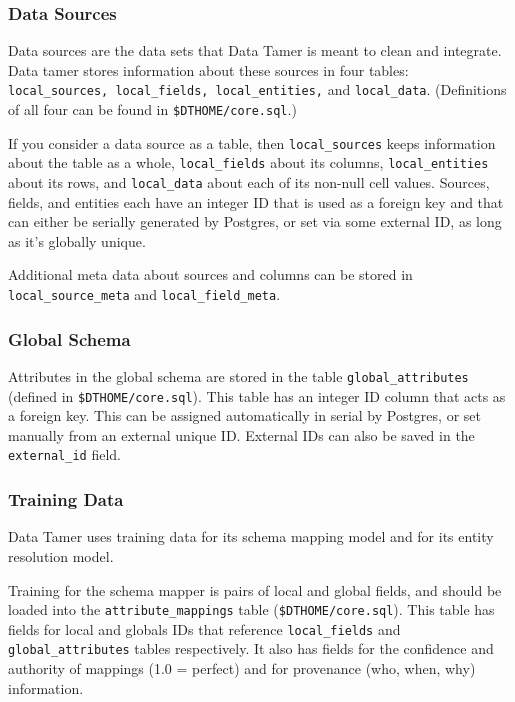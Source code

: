 \documentclass[12pt]{article}
\begin{document}
\subsubsection{Data Sources}

Data sources are the data sets that Data Tamer is meant to clean and integrate.  Data tamer stores information about these sources in four tables: \texttt{local\_sources, local\_fields, local\_entities,} and \texttt{local\_data}.  (Definitions of all four can be found in \texttt{\$DTHOME/core.sql}.)

If you consider a data source as a table, then \texttt{local\_sources} keeps information about the table as a whole, \texttt{local\_fields} about its columns, \texttt{local\_entities} about its rows, and \texttt{local\_data} about each of its non-null cell values.  Sources, fields, and entities each have an integer ID that is used as a foreign key and  that can either be serially generated by Postgres, or set via some external ID, as long as it's globally unique.

Additional meta data about sources and columns can be stored in \texttt{local\_source\_meta} and \texttt{local\_field\_meta}.

\subsubsection{Global Schema}

Attributes in the global schema are stored in the table \texttt{global\_attributes} (defined in \texttt{\$DTHOME/core.sql}).  This table has an integer ID column that acts as a foreign key.  This can be assigned automatically in serial by Postgres, or set manually from an external unique ID.  External IDs can also be saved in the \texttt{external\_id} field.

\subsubsection{Training Data}

Data Tamer uses training data for its schema mapping model and for its entity resolution model.

Training for the schema mapper is pairs of local and global fields, and should be loaded into the \texttt{attribute\_mappings} table (\texttt{\$DTHOME/core.sql}).  This table has fields for local and globals IDs that reference \texttt{local\_fields} and \texttt{global\_attributes} tables respectively.  It also has fields for the confidence and authority of mappings (1.0 = perfect) and for provenance (who, when, why) information.
\end{document}
